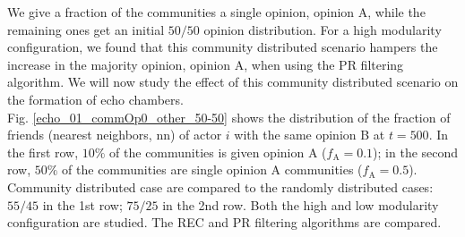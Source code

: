 \documentclass[11 pt , letterpaper , twoside , openright]{book}
\begin{document}
We give a fraction of the communities a single opinion, opinion A, while the remaining ones get an initial $50/50$ opinion distribution. For a high modularity configuration, we found that this community distributed scenario hampers the increase in the majority opinion, opinion A, when using the PR filtering algorithm. We will now study the effect of this community distributed scenario on the formation of echo chambers. \\
\newline
Fig. \ref{echo_01_commOp0_other_50-50} shows the distribution of the fraction of friends (nearest neighbors, nn) of actor $i$ with the same opinion B at $t=500$. In the first row, $10 \%$ of the communities is given opinion A ($f_\text{A} = 0.1$); in the second row, $50 \%$ of the communities are single opinion A communities ($f_\text{A} = 0.5$). Community distributed case are compared to the randomly distributed cases: $55/45$ in the 1st row; $75/25$ in the 2nd row. Both the high and low modularity configuration are studied. The REC and PR filtering algorithms are compared. \newpage
\end{document}
